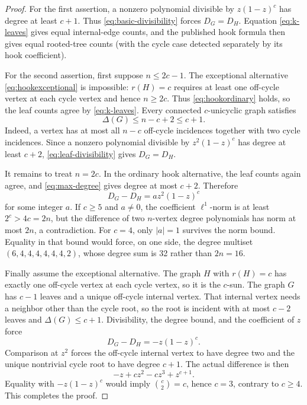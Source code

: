 \documentclass[11pt]{amsart}
\theoremstyle{definition}
\begin{document}
\begin{proof}
For the first assertion, a nonzero polynomial divisible by
\(z(1-z)^c\) has degree at least \(c+1\).  Thus
\eqref{eq:basic-divisibility} forces \(D_G=D_H\).  Equation
\eqref{eq:k-leaves} gives equal internal-edge counts, and the published hook
formula then gives equal rooted-tree counts (with the cycle case detected
separately by its hook coefficient).

For the second assertion, first suppose \(n\leq2c-1\).  The exceptional
alternative \eqref{eq:hookexceptional} is impossible: \(r(H)=c\) requires
at least one off-cycle vertex at each cycle vertex and hence \(n\geq2c\).
Thus \eqref{eq:hookordinary} holds, so the leaf counts agree by
\eqref{eq:k-leaves}.  Every connected \(c\)-unicyclic graph satisfies
\begin{equation}\label{eq:max-degree}
\Delta(G)\leq n-c+2\leq c+1.
\end{equation}
Indeed, a vertex has at most all \(n-c\) off-cycle incidences together with
two cycle incidences.  Since a nonzero polynomial divisible by
\(z^2(1-z)^c\) has degree at least \(c+2\),
\eqref{eq:leaf-divisibility} gives \(D_G=D_H\).

It remains to treat \(n=2c\).  In the ordinary hook alternative, the leaf
counts again agree, and \eqref{eq:max-degree} gives degree at most \(c+2\).
Therefore
\[
D_G-D_H=a z^2(1-z)^c
\]
for some integer \(a\).  If \(c\geq5\) and \(a\ne0\), the coefficient
\(\ell^1\)-norm is at least \(2^c>4c=2n\), but the difference of two
\(n\)-vertex degree polynomials has norm at most \(2n\), a contradiction.
For \(c=4\), only \(|a|=1\) survives the norm bound.  Equality in that bound
would force, on one side, the degree multiset
\((6,4,4,4,4,4,4,2)\), whose degree sum is 32 rather than \(2n=16\).

Finally assume the exceptional alternative.  The graph \(H\) with \(r(H)=c\)
has exactly one off-cycle vertex at each cycle vertex, so it is the
\(c\)-sun.  The graph \(G\) has \(c-1\) leaves and a unique off-cycle
internal vertex.  That internal vertex needs a neighbor other than the cycle
root, so the root is incident with at most \(c-2\) leaves and
\(\Delta(G)\leq c+1\).  Divisibility, the degree bound, and the coefficient
of \(z\) force
\[
D_G-D_H=-z(1-z)^c.
\]
Comparison at \(z^2\) forces the off-cycle internal vertex to have degree
two and the unique nontrivial cycle root to have degree \(c+1\).  The actual
difference is then
\[
-z+cz^2-cz^3+z^{c+1}.
\]
Equality with \(-z(1-z)^c\) would imply \(\binom c2=c\), hence \(c=3\),
contrary to \(c\geq4\).  This completes the proof.
\end{proof}
\end{document}
